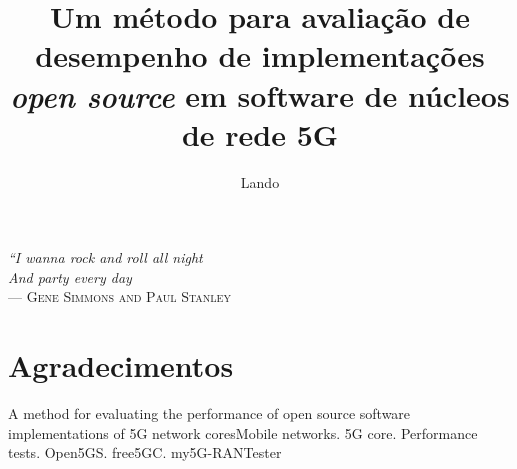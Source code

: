 \documentclass[ecp,tc]{iiufrgs}
\title{Um método para avaliação de desempenho de implementações \textit{open source} em software de núcleos de rede 5G}
\author{Lando}{Gabriel}
\begin{document}
\maketitle

\clearpage
\begin{flushright}
\mbox{}\vfill
{\sffamily\itshape
``I wanna rock and roll all night\\
And party every day\\}
--- \textsc{Gene Simmons and Paul Stanley}
\end{flushright}

\chapter*{Agradecimentos}



\begin{abstract}

\end{abstract}

\begin{englishabstract}{A method for evaluating the performance of open source software implementations of 5G network cores}{Mobile networks. 5G core. Performance tests. Open5GS. free5GC. my5G-RANTester}

\end{englishabstract}
\end{document}
